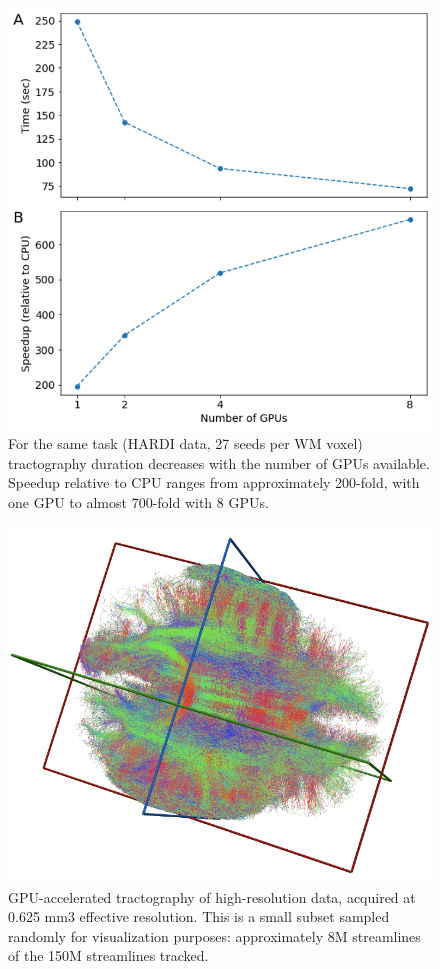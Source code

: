 \begin{figure}[htbp]
    \centering
    \includegraphics[width=\textwidth]{../figures/chapter2/speedup.png}
    \caption{For the same task (HARDI data, 27 seeds per WM voxel) tractography duration decreases with the number of GPUs available. Speedup relative to CPU ranges from approximately 200-fold, with one GPU to almost 700-fold with 8 GPUs.}
    \label{fig:gpu_speedup}
\end{figure}

\begin{figure}[htbp]
	\centering
	\includegraphics[width=\textwidth]{../figures/chapter2/streamlines.png}
	\caption{GPU-accelerated tractography of high-resolution data, acquired at 0.625 mm3  effective resolution. This is a small subset sampled randomly for visualization purposes: approximately 8M streamlines of the 150M streamlines tracked.}
	\label{fig:gpu_streamlines}
\end{figure}

